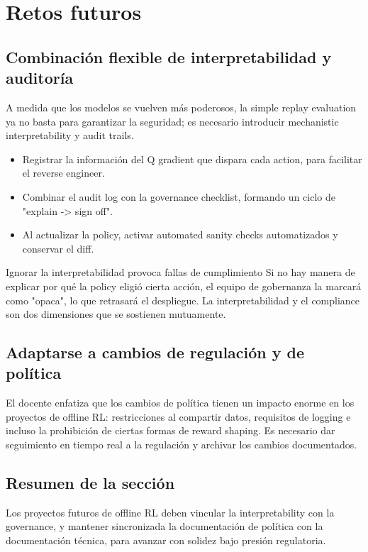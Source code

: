 \section{Retos futuros}

\subsection{Combinación flexible de interpretabilidad y auditoría}

A medida que los modelos se vuelven más poderosos, la simple replay evaluation ya no basta para garantizar la seguridad; es necesario introducir mechanistic interpretability y audit trails.

\begin{itemize}
    \item Registrar la información del Q gradient que dispara cada action, para facilitar el reverse engineer.
    \item Combinar el audit log con la governance checklist, formando un ciclo de "explain -> sign off".
    \item Al actualizar la policy, activar automated sanity checks automatizados y conservar el diff.
\end{itemize}

\begin{warningbox}{Ignorar la interpretabilidad provoca fallas de cumplimiento}
Si no hay manera de explicar por qué la policy eligió cierta acción, el equipo de gobernanza la marcará como "opaca", lo que retrasará el despliegue. La interpretabilidad y el compliance son dos dimensiones que se sostienen mutuamente.
\end{warningbox}

\subsection{Adaptarse a cambios de regulación y de política}

El docente enfatiza que los cambios de política tienen un impacto enorme en los proyectos de offline RL: restricciones al compartir datos, requisitos de logging e incluso la prohibición de ciertas formas de reward shaping. Es necesario dar seguimiento en tiempo real a la regulación y archivar los cambios documentados.

\subsection{Resumen de la sección}

Los proyectos futuros de offline RL deben vincular la interpretability con la governance, y mantener sincronizada la documentación de política con la documentación técnica, para avanzar con solidez bajo presión regulatoria.

